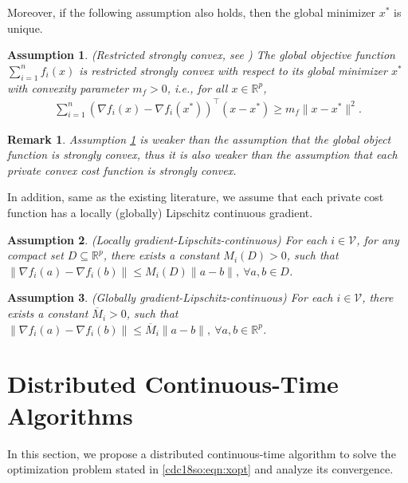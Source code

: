 \documentclass[letterpaper, 10 pt, conference]{ieeeconf}  %
\newcommand{\red}[1]{{\color{red} #1}}
\newtheorem{assumption}{Assumption}
\newtheorem{remark}{Remark}
\begin{document}
Moreover, if the following assumption also holds, then the global minimizer $x^*$ is unique.
\begin{assumption}\label{cdc18so:ass:fil} (Restricted strongly convex, see \cite{shi2015extra}) The global objective function $\sum_{i=1}^nf_i(x)$ is restricted strongly convex with respect to its global minimizer $x^*$ with convexity parameter $m_f>0$, i.e., for all $x\in\mathbb{R}^p$,
\begin{align*}
\sum_{i=1}^n(\nabla f_i(x)-\nabla f_i(x^*))^\top(x-x^*)\ge m_f\|x-x^*\|^2.
\end{align*}
\end{assumption}

\begin{remark}
Assumption \ref{cdc18so:ass:fil} is weaker than the assumption that the global object function is strongly convex, thus it is also weaker than the assumption that each private convex cost function is strongly convex.
\end{remark}

In addition, same as the existing literature, we assume that each  private cost  function has a locally (globally) Lipschitz continuous gradient.
\begin{assumption}\label{cdc18so:ass:fiu} (Locally  gradient-Lipschitz-continuous)
For each $i\in \mathcal{V}$, for any compact set $D\subseteq\mathbb{R}^p$, there exists a constant $M_i(D)>0$, such that $\|\nabla f_i(a)-\nabla f_i(b)\|\le M_i(D)\|a-b\|,~\forall a,b\in D$.
\end{assumption}
\begin{assumption}\label{cdc18so:ass:fiug} (Globally  gradient-Lipschitz-continuous)
For each $i\in \mathcal{V}$,  there exists a constant $\overline{M}_i>0$, such that $\|\nabla f_i(a)-\nabla f_i(b)\|\le \overline{M}_i\|a-b\|,~\forall a,b\in\mathbb{R}^p$.
\end{assumption}



\section{Distributed Continuous-Time Algorithms}\label{cdc18so:sec:cont}
In this section, we propose a distributed continuous-time algorithm to solve the optimization problem stated in \eqref{cdc18so:eqn:xopt} and analyze its convergence.
\end{document}

